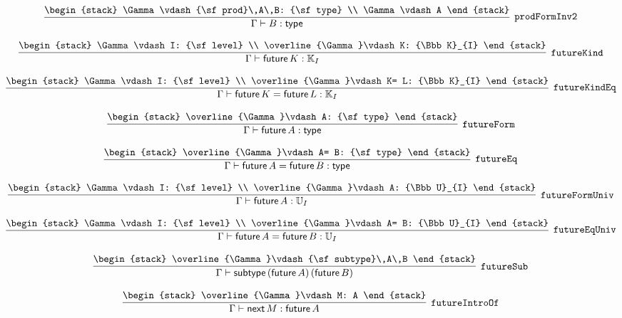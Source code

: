 \[
\infer[{\tt prodFormInv2}]{\Gamma \vdash B: {\sf type}}{
\begin{stack}
\Gamma \vdash {\sf prod}\,A\,B: {\sf type}
\\
\Gamma \vdash A
\end{stack}}
\]

\[
\infer[{\tt futureKind}]{\Gamma \vdash {\sf future}\,K: {\Bbb K}_{I}}{
\begin{stack}
\Gamma \vdash I: {\sf level}
\\
\overline{\Gamma}\vdash K: {\Bbb K}_{I}
\end{stack}}
\]

\[
\infer[{\tt futureKindEq}]{\Gamma \vdash {\sf future}\,K= {\sf future}\,L: {\Bbb K}_{I}}{
\begin{stack}
\Gamma \vdash I: {\sf level}
\\
\overline{\Gamma}\vdash K= L: {\Bbb K}_{I}
\end{stack}}
\]

\[
\infer[{\tt futureForm}]{\Gamma \vdash {\sf future}\,A: {\sf type}}{
\begin{stack}
\overline{\Gamma}\vdash A: {\sf type}
\end{stack}}
\]

\[
\infer[{\tt futureEq}]{\Gamma \vdash {\sf future}\,A= {\sf future}\,B: {\sf type}}{
\begin{stack}
\overline{\Gamma}\vdash A= B: {\sf type}
\end{stack}}
\]

\[
\infer[{\tt futureFormUniv}]{\Gamma \vdash {\sf future}\,A: {\Bbb U}_{I}}{
\begin{stack}
\Gamma \vdash I: {\sf level}
\\
\overline{\Gamma}\vdash A: {\Bbb U}_{I}
\end{stack}}
\]

\[
\infer[{\tt futureEqUniv}]{\Gamma \vdash {\sf future}\,A= {\sf future}\,B: {\Bbb U}_{I}}{
\begin{stack}
\Gamma \vdash I: {\sf level}
\\
\overline{\Gamma}\vdash A= B: {\Bbb U}_{I}
\end{stack}}
\]

\[
\infer[{\tt futureSub}]{\Gamma \vdash {\sf subtype}\,({\sf future}\,A)\,({\sf future}\,B)}{
\begin{stack}
\overline{\Gamma}\vdash {\sf subtype}\,A\,B
\end{stack}}
\]

\[
\infer[{\tt futureIntroOf}]{\Gamma \vdash {\sf next}\,M: {\sf future}\,A}{
\begin{stack}
\overline{\Gamma}\vdash M: A
\end{stack}}
\]

